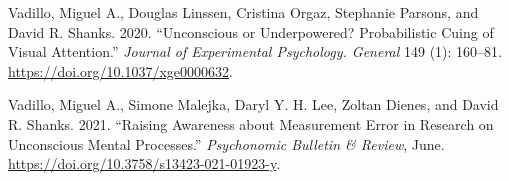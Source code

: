 \documentclass{article}
\newlength{\cslhangindent}
\newlength{\cslentryspacingunit} %
\newenvironment{CSLReferences}[2] %
 {%
  \setlength{\parindent}{0pt}
  \ifodd #1
  \let\oldpar\par
  \def\par{\hangindent=\cslhangindent\oldpar}
  \fi
  \setlength{\parskip}{#2\cslentryspacingunit}
 }%
 {}
\begin{document}
\begin{CSLReferences}{1}{0}
\leavevmode{}%
Vadillo, Miguel A., Douglas Linssen, Cristina Orgaz, Stephanie Parsons, and David R. Shanks. 2020. {``Unconscious or Underpowered? {Probabilistic} Cuing of Visual Attention.''} \emph{Journal of Experimental Psychology. General} 149 (1): 160--81. \url{https://doi.org/10.1037/xge0000632}.

\leavevmode{}%
Vadillo, Miguel A., Simone Malejka, Daryl Y. H. Lee, Zoltan Dienes, and David R. Shanks. 2021. {``Raising Awareness about Measurement Error in Research on Unconscious Mental Processes.''} \emph{Psychonomic Bulletin \& Review}, June. \url{https://doi.org/10.3758/s13423-021-01923-y}.

\end{CSLReferences}



\end{document}
